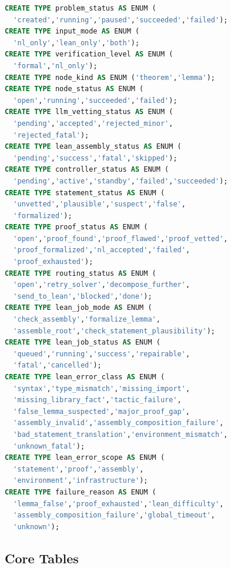 \documentclass[11pt,a4paper]{article}
\begin{document}
\begin{lstlisting}[language=sql]
CREATE TYPE problem_status AS ENUM (
  'created','running','paused','succeeded','failed');
CREATE TYPE input_mode AS ENUM (
  'nl_only','lean_only','both');
CREATE TYPE verification_level AS ENUM (
  'formal','nl_only');
CREATE TYPE node_kind AS ENUM ('theorem','lemma');
CREATE TYPE node_status AS ENUM (
  'open','running','succeeded','failed');
CREATE TYPE llm_vetting_status AS ENUM (
  'pending','accepted','rejected_minor',
  'rejected_fatal');
CREATE TYPE lean_assembly_status AS ENUM (
  'pending','success','fatal','skipped');
CREATE TYPE controller_status AS ENUM (
  'pending','active','standby','failed','succeeded');
CREATE TYPE statement_status AS ENUM (
  'unvetted','plausible','suspect','false',
  'formalized');
CREATE TYPE proof_status AS ENUM (
  'open','proof_found','proof_flawed','proof_vetted',
  'proof_formalized','nl_accepted','failed',
  'proof_exhausted');
CREATE TYPE routing_status AS ENUM (
  'open','retry_solver','decompose_further',
  'send_to_lean','blocked','done');
CREATE TYPE lean_job_mode AS ENUM (
  'check_assembly','formalize_lemma',
  'assemble_root','check_statement_plausibility');
CREATE TYPE lean_job_status AS ENUM (
  'queued','running','success','repairable',
  'fatal','cancelled');
CREATE TYPE lean_error_class AS ENUM (
  'syntax','type_mismatch','missing_import',
  'missing_library_fact','tactic_failure',
  'false_lemma_suspected','major_proof_gap',
  'assembly_invalid','assembly_composition_failure',
  'bad_statement_translation','environment_mismatch',
  'unknown_fatal');
CREATE TYPE lean_error_scope AS ENUM (
  'statement','proof','assembly',
  'environment','infrastructure');
CREATE TYPE failure_reason AS ENUM (
  'lemma_false','proof_exhausted','lean_difficulty',
  'assembly_composition_failure','global_timeout',
  'unknown');
\end{lstlisting}

\subsection{Core Tables}
\end{document}
